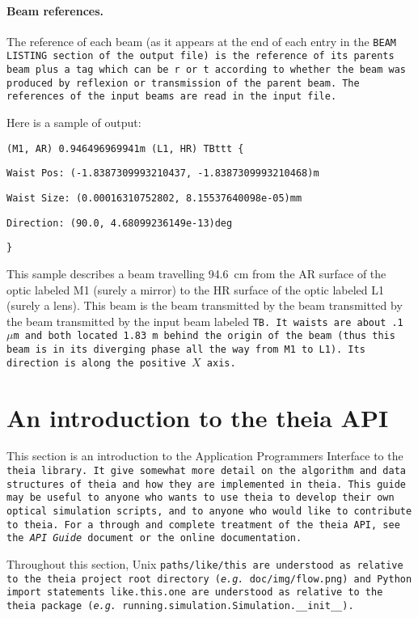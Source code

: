 \documentclass{article}
\begin{document}
\paragraph{Beam references.}The reference of each beam (as it appears at the end of each entry in the \tt{BEAM LISTING} section of the output file) is the reference of its parents beam plus a tag which can be \tt{r} or \tt{t} according to whether the beam was produced by reflexion or transmission of the parent beam. The references of the input beams are read in the input file.


Here is a sample of output:

\tt{(M1, AR) 0.946496969941m (L1, HR) TBttt \{}

	\quad	\tt{Waist Pos: (-1.8387309993210437, -1.8387309993210468)m}
	
	\quad	\tt{Waist Size: (0.00016310752802, 8.15537640098e-05)mm}
	
	\quad	\tt{Direction: (90.0, 4.68099236149e-13)deg}
	
	\tt{\}}
	
This sample describes a beam travelling 94.6~cm from the AR surface of the optic labeled M1 (surely a mirror) to the HR surface of the optic labeled L1 (surely a lens). This beam is the beam transmitted by the beam transmitted by the beam transmitted by the input beam labeled \tt{TB}. It waists are about .1~$\mu$m and both located 1.83~m behind the origin of the beam (thus this beam is in its diverging phase all the way from M1 to L1). Its direction is along the positive $X$ axis.

\newpage
\section{An introduction to the theia API}

This section is an introduction to the Application Programmers Interface to the \tt{theia} library. It give somewhat more detail on the algorithm and data structures of theia and how they are implemented in \tt{theia}. This guide may be useful to anyone who wants to use \tt{theia} to develop their own optical simulation scripts, and to anyone who would like to contribute to \tt{theia}. For a through and complete treatment of the \tt{theia} API, see the \textit{API Guide} document or the online documentation.

Throughout this section, Unix \tt{paths/like/this} are understood as relative to the theia project root directory (\textit{e.g.} \tt{doc/img/flow.png}) and Python import statements \tt{like.this.one} are understood as relative to the theia package (\textit{e.g.} \tt{running.simulation.Simulation.\_\_init\_\_}).
\end{document}
